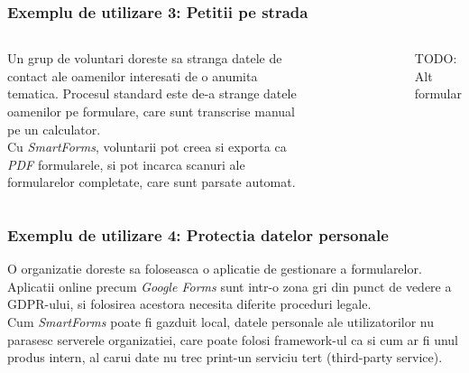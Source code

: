 \documentclass[9pt]{beamer}
\begin{document}
\begin{frame}
	\frametitle{Exemplu de utilizare 3: Petitii pe strada}
	\begin{columns}
		Un grup de voluntari doreste sa stranga datele de contact ale oamenilor interesati de o anumita tematica. Procesul standard este de-a strange datele oamenilor pe formulare, care sunt transcrise manual pe un calculator.\\
		\vspace{10pt}
		Cu \textit{SmartForms}, voluntarii pot creea si exporta ca \textit{PDF} formularele, si pot incarca scanuri ale formularelor completate, care sunt parsate automat.
		\begin{figure}[!h]
			\centering
		\end{figure}
		TODO: Alt formular
	\end{columns}
\end{frame}


\begin{frame}
	\frametitle{Exemplu de utilizare 4: Protectia datelor personale}
	O organizatie doreste sa foloseasca o aplicatie de gestionare a formularelor. Aplicatii online precum \textit{Google Forms} sunt intr-o zona gri din punct de vedere a GDPR-ului, si folosirea acestora necesita diferite proceduri legale.\\
	\vspace{10pt}
	Cum \textit{SmartForms} poate fi gazduit local, datele personale ale utilizatorilor nu parasesc serverele organizatiei, care poate folosi framework-ul ca si cum ar fi unul produs intern, al carui date nu trec print-un serviciu tert (third-party service).
			
\end{frame}
\end{document}
